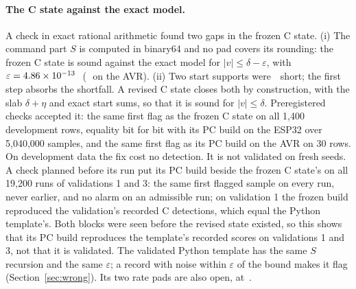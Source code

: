 \paragraph{The C state against the exact model.} A check in exact rational arithmetic found two gaps in the frozen C
state. (i) The command part $S$ is computed in binary64 and no pad covers its rounding: the frozen C state is sound
against the exact model for $|v|\le\delta-\varepsilon$, with $\varepsilon = 4.86\times10^{-13}$\,\degC\
(\,\degC\ on the AVR). (ii) Two start supports were \,\degC\ short; the first step absorbs
the shortfall. A revised C state closes both by construction, with the slab $\delta+\eta$ and exact start sums, so that
it is sound for $|v|\le\delta$. Preregistered checks accepted it: the same first flag as the frozen C state on all
1,400 development rows, equality bit for bit with its PC build on the ESP32 over 5,040,000 samples, and the same first
flag as its PC build on the AVR on 30 rows. On development data the fix cost no detection. It is not validated on
fresh seeds. A check planned before its run put its PC build beside the frozen C state's on all 19,200 runs of
validations 1 and 3: the same first flagged sample on every run, never earlier, and no alarm on an admissible run; on
validation 1 the frozen build reproduced the validation's recorded C detections, which equal the Python template's.
Both blocks were seen before the revised state existed, so this shows that its PC build reproduces the template's
recorded scores on validations 1 and 3, not that it is validated.
The validated Python template has the same $S$ recursion and the same $\varepsilon$; a record with noise
within $\varepsilon$ of the bound makes it flag (Section~\ref{sec:wrong}). Its two rate pads are also open, at
\sci{2.1}{-21}\,\degC.

